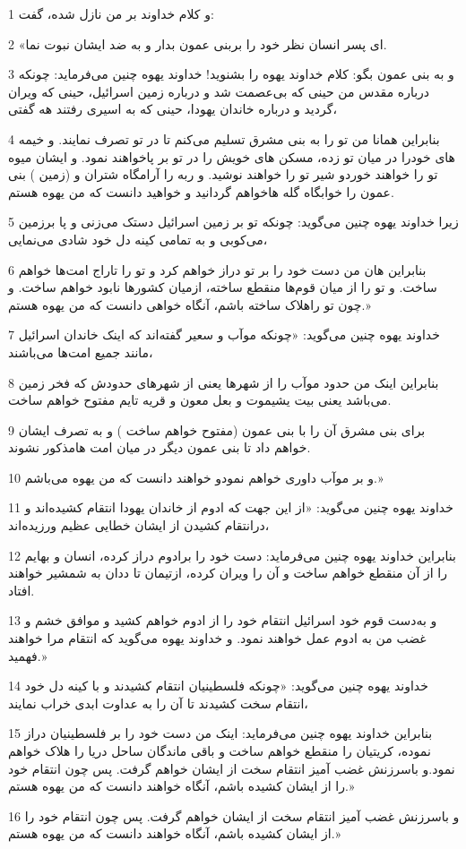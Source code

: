 \par 1 و کلام خداوند بر من نازل شده، گفت:
\par 2 «ای پسر انسان نظر خود را بربنی عمون بدار و به ضد ایشان نبوت نما.
\par 3 و به بنی عمون بگو: کلام خداوند یهوه را بشنوید! خداوند یهوه چنین می‌فرماید: چونکه درباره مقدس من حینی که بی‌عصمت شد و درباره زمین اسرائیل، حینی که ویران گردید و درباره خاندان یهودا، حینی که به اسیری رفتند هه گفتی،
\par 4 بنابراین همانا من تو را به بنی مشرق تسلیم می‌کنم تا در تو تصرف نمایند. و خیمه های خودرا در میان تو زده، مسکن های خویش را در تو بر پاخواهند نمود. و ایشان میوه تو را خواهند خوردو شیر تو را خواهند نوشید. و ربه را آرامگاه شتران و (زمین ) بنی عمون را خوابگاه گله هاخواهم گردانید و خواهید دانست که من یهوه هستم.
\par 5 زیرا خداوند یهوه چنین می‌گوید: چونکه تو بر زمین اسرائیل دستک می‌زنی و پا برزمین می‌کوبی و به تمامی کینه دل خود شادی می‌نمایی،
\par 6 بنابراین هان من دست خود را بر تو دراز خواهم کرد و تو را تاراج امت‌ها خواهم ساخت. و تو را از میان قوم‌ها منقطع ساخته، ازمیان کشورها نابود خواهم ساخت. و چون تو راهلاک ساخته باشم، آنگاه خواهی دانست که من یهوه هستم.»
\par 7 خداوند یهوه چنین می‌گوید: «چونکه موآب و سعیر گفته‌اند که اینک خاندان اسرائیل مانند جمیع امت‌ها می‌باشند،
\par 8 بنابراین اینک من حدود موآب را از شهرها یعنی از شهرهای حدودش که فخر زمین می‌باشد یعنی بیت یشیموت و بعل معون و قریه تایم مفتوح خواهم ساخت.
\par 9 برای بنی مشرق آن را با بنی عمون (مفتوح خواهم ساخت ) و به تصرف ایشان خواهم داد تا بنی عمون دیگر در میان امت هامذکور نشوند.
\par 10 و بر موآب داوری خواهم نمودو خواهند دانست که من یهوه می‌باشم.»
\par 11 خداوند یهوه چنین می‌گوید: «از این جهت که ادوم از خاندان یهودا انتقام کشیده‌اند و درانتقام کشیدن از ایشان خطایی عظیم ورزیده‌اند،
\par 12 بنابراین خداوند یهوه چنین می‌فرماید: دست خود را برادوم دراز کرده، انسان و بهایم را از آن منقطع خواهم ساخت و آن را ویران کرده، ازتیمان تا ددان به شمشیر خواهند افتاد.
\par 13 و به‌دست قوم خود اسرائیل انتقام خود را از ادوم خواهم کشید و موافق خشم و غضب من به ادوم عمل خواهند نمود. و خداوند یهوه می‌گوید که انتقام مرا خواهند فهمید.»
\par 14 خداوند یهوه چنین می‌گوید: «چونکه فلسطینیان انتقام کشیدند و با کینه دل خود انتقام سخت کشیدند تا آن را به عداوت ابدی خراب نمایند،
\par 15 بنابراین خداوند یهوه چنین می‌فرماید: اینک من دست خود را بر فلسطینیان دراز نموده، کریتیان را منقطع خواهم ساخت و باقی ماندگان ساحل دریا را هلاک خواهم نمود.و باسرزنش غضب آمیز انتقام سخت از ایشان خواهم گرفت. پس چون انتقام خود را از ایشان کشیده باشم، آنگاه خواهند دانست که من یهوه هستم.»
\par 16 و باسرزنش غضب آمیز انتقام سخت از ایشان خواهم گرفت. پس چون انتقام خود را از ایشان کشیده باشم، آنگاه خواهند دانست که من یهوه هستم.»


